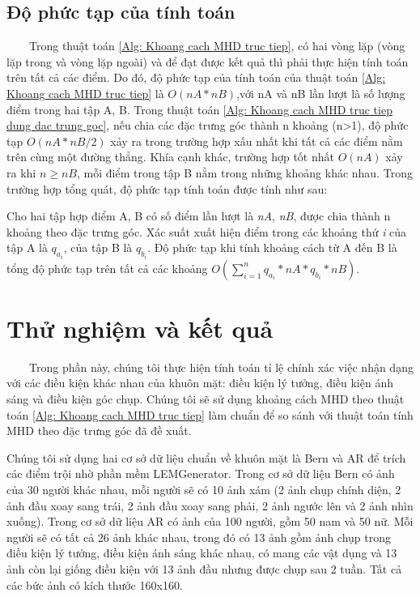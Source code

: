 \documentclass[runningheads]{llncs}
\begin{document}
\subsection{Độ phức tạp của tính toán}
\label{ContentS: Do phuc tap cua tinh toan}
~~~~Trong thuật toán \ref{Alg: Khoang cach MHD truc tiep}, có hai vòng lặp (vòng lặp trong và vòng lặp ngoài) và để đạt được kết quả thì phải thực hiện tính toán trên tất cả các điểm. Do đó, độ phức tạp của tính toán của thuật toán \ref{Alg: Khoang cach MHD truc tiep} là $O(nA*nB)$,với nA và nB lần lượt là số lượng điểm trong hai tập A, B.
Trong thuật toán \ref{Alg: Khoang cach MHD truc tiep dung dac trung goc}, nếu chia các đặc trưng góc thành n khoảng (n>1), độ phức tạp $O(nA*nB/2)$ xảy ra trong trường hợp xấu nhất khi tất cả các điểm nằm trên cùng một đường thẳng. Khía cạnh khác, trường hợp tốt nhất $O(nA)$ xảy ra khi $n \geqslant nB$, mỗi điểm trong tập B nằm trong những khoảng khác nhau. Trong trường hợp tổng quát, độ phức tạp tính toán được tính như sau:

Cho hai tập hợp điểm A, B có số điểm lần lượt là \textit{nA}, \textit{nB}, được chia thành n khoảng theo đặc trưng góc. Xác suất xuất hiện điểm trong các khoảng thứ \textit{i} của tập A là $q_{a_{i}}$, của tập B là $q_{b_{i}}$. Độ phức tạp khi tính khoảng cách từ A đến B là tổng độ phức tạp trên tất cả các khoảng $O(\sum_{i=1}^{n}{q_{a_{i}}*nA*q_{b_{i}}*nB})$.

\section{Thử nghiệm và kết quả}
\label{Content: Thu nghiem va ket qua}
~~~~Trong phần này, chúng tôi thực hiện tính toán tỉ lệ chính xác việc nhận dạng với các điều kiện khác nhau của khuôn mặt: điều kiện lý tưởng, điều kiện ánh sáng và điều kiện góc chụp. Chúng tôi sẽ sử dụng khoảng cách MHD theo thuật toán \ref{Alg: Khoang cach MHD truc tiep} làm chuẩn để so sánh với thuật toán tính MHD theo đặc trưng góc đã đề xuất.

Chúng tôi sử dụng hai cơ sở dữ liệu chuẩn về khuôn mặt là Bern và AR để trích các điểm trội nhờ phần mềm LEMGenerator. Trong cơ sở dữ liệu Bern có ảnh của 30 người khác nhau, mỗi người sẽ có 10 ảnh xám (2 ảnh chụp chính diện, 2 ảnh đầu xoay sang trái, 2 ảnh đầu xoay sang phải, 2 ảnh ngước lên và 2 ảnh nhìn xuống). Trong cơ sở dữ liệu AR có ảnh của 100 người, gồm 50 nam và 50 nữ. Mỗi người sẽ có tất cả 26 ảnh khác nhau, trong đó có 13 ảnh gồm ảnh chụp trong điều kiện lý tưởng, điều kiện ánh sáng khác nhau, có mang các vật dụng và 13 ảnh còn lại giống điều kiện với 13 ảnh đầu nhưng được chụp sau 2 tuần. Tất cả các bức ảnh có kích thước 160x160.
\end{document}
